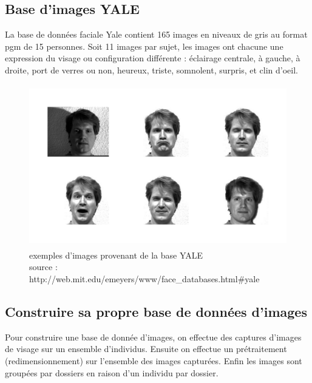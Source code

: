 \subsection{Base d'images YALE} \label{yale}

La base de données faciale Yale contient 165 images en niveaux de gris au format pgm de 15 personnes. Soit 11 images par sujet, les images ont chacune une expression du visage ou configuration différente : éclairage centrale, à gauche, à droite, port de verres ou non, heureux, triste, somnolent, surpris, et clin d'oeil.
\begin{figure}[htbp]
	\centering
		\includegraphics[width=450pt,height=200pt]{YAL.jpg}
		\caption[exemples d'images provenant de la base YALE ]{exemples d'images provenant de la base YALE \\
		source : http://web.mit.edu/emeyers/www/face\_databases.html\#yale}
	\label{fig:YAL}
\end{figure}

\subsection{Construire sa propre base de données d'images}
Pour construire une base de donnée d'images, on effectue des captures d'images de visage sur un ensemble d'individus. Ensuite on effectue un prétraitement (redimensionnement) sur l'ensemble des images capturées. Enfin les images sont groupées par dossiers en raison d'un individu par dossier.
